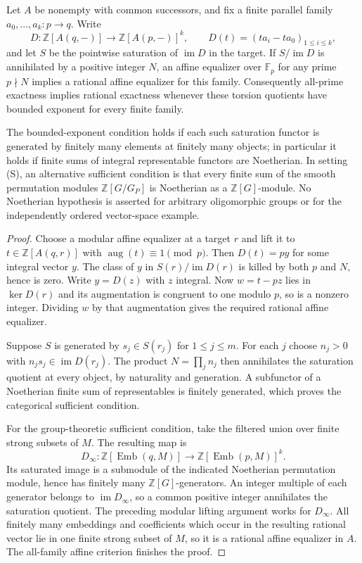 \begin{proposition}
\label{C4:noetherian}
Let $A$ be nonempty with common successors, and fix a finite parallel
family $a_0,\ldots,a_k:p\to q$. Write
\[
 D:\mathbb Z[A(q,-)]\longrightarrow
       \mathbb Z[A(p,-)]^k,
 \qquad D(t)=(ta_i-ta_0)_{1\leq i\leq k},
\]
and let $S$ be the pointwise saturation of $\operatorname{im}D$ in
the target. If $S/\operatorname{im}D$ is annihilated by a positive
integer $N$, an affine equalizer over $\mathbb F_p$ for any prime
$p\nmid N$ implies a rational affine equalizer for this family.
Consequently all-prime exactness implies rational exactness whenever
these torsion quotients have bounded exponent for every finite family.

The bounded-exponent condition holds if each such saturation functor
is generated by finitely many elements at finitely many objects;
in particular it holds if finite sums of integral representable
functors are Noetherian. In setting (S), an alternative sufficient
condition is that every finite sum of the smooth permutation modules
$\mathbb Z[G/G_P]$ is Noetherian as a $\mathbb Z[G]$-module.
No Noetherian hypothesis is asserted for arbitrary oligomorphic
groups or for the independently ordered vector-space example.
\end{proposition}
\begin{proof}
Choose a modular affine equalizer at a target $r$ and lift it to
$t\in\mathbb Z[A(q,r)]$ with $\operatorname{aug}(t)\equiv1\pmod p$.
Then $D(t)=p y$ for some integral vector $y$. The class of $y$ in
$S(r)/\operatorname{im}D(r)$ is killed by both $p$ and $N$, hence is
zero. Write $y=D(z)$ with $z$ integral. Now
$w=t-pz$ lies in $\ker D(r)$ and its augmentation is congruent to
one modulo $p$, so is a nonzero integer. Dividing $w$ by that
augmentation gives the required rational affine equalizer.

Suppose $S$ is generated by $s_j\in S(r_j)$ for $1\leq j\leq m$.
For each $j$ choose $n_j>0$ with $n_js_j\in\operatorname{im}D(r_j)$.
The product $N=\prod_jn_j$ then annihilates the saturation quotient
at every object, by naturality and generation. A subfunctor of a
Noetherian finite sum of representables is finitely generated, which
proves the categorical sufficient condition.

For the group-theoretic sufficient condition, take the filtered union
over finite strong subsets of $M$. The resulting map is
\[
 D_\infty:\mathbb Z[\operatorname{Emb}(q,M)]\longrightarrow
             \mathbb Z[\operatorname{Emb}(p,M)]^k.
\]
Its saturated image is a submodule of the indicated Noetherian
permutation module, hence has finitely many $\mathbb Z[G]$-generators.
An integer multiple of each generator belongs to
$\operatorname{im}D_\infty$, so a common positive integer annihilates
the saturation quotient. The preceding modular lifting argument
works for $D_\infty$. All finitely many embeddings and coefficients
which occur in the resulting rational vector lie in one finite
strong subset of $M$, so it is a rational affine equalizer in $A$.
The all-family affine criterion finishes the proof.
\end{proof}

